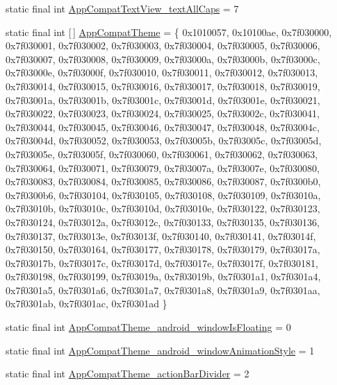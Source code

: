 \begin{DoxyCompactItemize}
\item 
static final int \mbox{\hyperlink{classandroid_1_1support_1_1design_1_1_r_1_1styleable_a0baa66e50309da6d36b351e27495ab50}{App\+Compat\+Text\+View\+\_\+text\+All\+Caps}} = 7
\item 
static final int \mbox{[}$\,$\mbox{]} \mbox{\hyperlink{classandroid_1_1support_1_1design_1_1_r_1_1styleable_afb351dc8de20cbd4c89abe360373010c}{App\+Compat\+Theme}} = \{ 0x1010057, 0x10100ae, 0x7f030000, 0x7f030001, 0x7f030002, 0x7f030003, 0x7f030004, 0x7f030005, 0x7f030006, 0x7f030007, 0x7f030008, 0x7f030009, 0x7f03000a, 0x7f03000b, 0x7f03000c, 0x7f03000e, 0x7f03000f, 0x7f030010, 0x7f030011, 0x7f030012, 0x7f030013, 0x7f030014, 0x7f030015, 0x7f030016, 0x7f030017, 0x7f030018, 0x7f030019, 0x7f03001a, 0x7f03001b, 0x7f03001c, 0x7f03001d, 0x7f03001e, 0x7f030021, 0x7f030022, 0x7f030023, 0x7f030024, 0x7f030025, 0x7f03002c, 0x7f030041, 0x7f030044, 0x7f030045, 0x7f030046, 0x7f030047, 0x7f030048, 0x7f03004c, 0x7f03004d, 0x7f030052, 0x7f030053, 0x7f03005b, 0x7f03005c, 0x7f03005d, 0x7f03005e, 0x7f03005f, 0x7f030060, 0x7f030061, 0x7f030062, 0x7f030063, 0x7f030064, 0x7f030071, 0x7f030079, 0x7f03007a, 0x7f03007e, 0x7f030080, 0x7f030083, 0x7f030084, 0x7f030085, 0x7f030086, 0x7f030087, 0x7f0300b0, 0x7f0300b6, 0x7f030104, 0x7f030105, 0x7f030108, 0x7f030109, 0x7f03010a, 0x7f03010b, 0x7f03010c, 0x7f03010d, 0x7f03010e, 0x7f030122, 0x7f030123, 0x7f030124, 0x7f03012a, 0x7f03012c, 0x7f030133, 0x7f030135, 0x7f030136, 0x7f030137, 0x7f03013e, 0x7f03013f, 0x7f030140, 0x7f030141, 0x7f03014f, 0x7f030150, 0x7f030164, 0x7f030177, 0x7f030178, 0x7f030179, 0x7f03017a, 0x7f03017b, 0x7f03017c, 0x7f03017d, 0x7f03017e, 0x7f03017f, 0x7f030181, 0x7f030198, 0x7f030199, 0x7f03019a, 0x7f03019b, 0x7f0301a1, 0x7f0301a4, 0x7f0301a5, 0x7f0301a6, 0x7f0301a7, 0x7f0301a8, 0x7f0301a9, 0x7f0301aa, 0x7f0301ab, 0x7f0301ac, 0x7f0301ad \}
\item 
static final int \mbox{\hyperlink{classandroid_1_1support_1_1design_1_1_r_1_1styleable_a46b267f5526986760e108340d38903c0}{App\+Compat\+Theme\+\_\+android\+\_\+window\+Is\+Floating}} = 0
\item 
static final int \mbox{\hyperlink{classandroid_1_1support_1_1design_1_1_r_1_1styleable_a9dc98748c7a94ae12cefeab10283092e}{App\+Compat\+Theme\+\_\+android\+\_\+window\+Animation\+Style}} = 1
\item 
static final int \mbox{\hyperlink{classandroid_1_1support_1_1design_1_1_r_1_1styleable_af6a9eaeff0ad44a2869e2b2e9b333e1e}{App\+Compat\+Theme\+\_\+action\+Bar\+Divider}} = 2
\item 

\end{DoxyCompactItemize}
